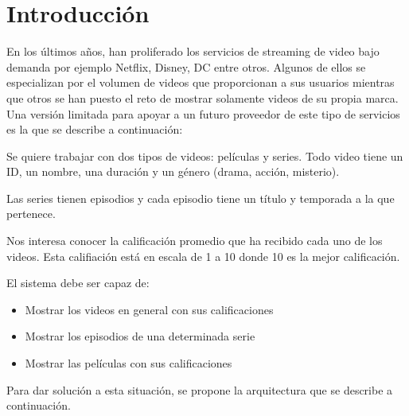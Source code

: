 \section{Introducción}

En los últimos años, han proliferado los servicios de streaming de video bajo demanda por ejemplo Netflix, Disney, DC entre otros. Algunos de ellos se especializan por el volumen de videos que proporcionan a sus usuarios mientras que otros se han puesto el reto de mostrar solamente videos de su propia marca. Una versión limitada para apoyar a un futuro proveedor de este tipo de servicios es la que se describe a continuación:

Se quiere trabajar con dos tipos de videos: películas y series. Todo video tiene un ID, un nombre, una duración y un género (drama, acción, misterio).

Las series tienen episodios y cada episodio tiene un título y temporada a la que pertenece.

Nos interesa conocer la calificación promedio que ha recibido cada uno de los videos. Esta califiación está en escala de 1 a  10 donde 10 es la mejor calificación.

El sistema debe ser capaz de:

\begin{itemize}
	\item Mostrar los videos en general con sus calificaciones
	\item Mostrar los episodios de una determinada serie
	\item Mostrar las películas con sus calificaciones
\end{itemize}

Para dar solución a esta situación, se propone la arquitectura que se describe a continuación.